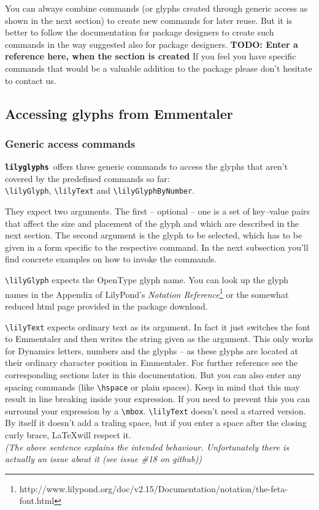 \documentclass{article}
\newcommand{\lilyglyphs}{\texttt{\textbf{lilyglyphs\,}}}
\newcommand*{\cmd}[1]{\texttt{\textbackslash #1}}
\begin{document}
You can always combine commands (or glyphs created through generic access as shown in the next section) to create new commands for later reuse. 
But it is better to follow the documentation for package designers to create such commands in the way suggested also for package designers.
\textbf{TODO: Enter a reference here, when the section is created}
If you feel you have specific commands that would be a valuable addition to the package please don't hesitate to contact us.



\subsection{Accessing glyphs from Emmentaler}
\subsubsection{Generic access commands}
\lilyglyphs offers three generic commands to access the glyphs that aren't covered by the predefined commands so far: \\
\cmd{lilyGlyph}, \cmd{lilyText} and \cmd{lilyGlyphByNumber}. 

They expect two arguments. 
The first -- optional -- one is a set of key--value pairs that affect the size and placement of the glyph and which are described in the next section.
The second argument is the glyph to be selected, which has to be given in a form specific to the respective command.
In the next subsection you'll find concrete examples on how to invoke the commands.

\cmd{lilyGlyph} expects the OpenType glyph name. 
You can look up the glyph names in the Appendix of LilyPond's \emph{Notation Reference}\footnote{http://www.lilypond.org/doc/v2.15/Documentation/notation/the-feta-font.html} or the somewhat reduced html page provided in the package download.

\cmd{lilyText} expects ordinary text as its argument. 
In fact it just switches the font to Emmentaler and then writes the string given as the argument. 
This only works for Dynamics letters, numbers and the glyphs  -- as these glyphs are located at their ordinary character position in Emmentaler. 
For further reference see the corresponding sections later in this documentation. 
But you can also enter any spacing commands (like \cmd{hspace} or plain spaces). 
Keep in mind that this may result in line breaking inside your expression. 
If you need to prevent this you can surround your expression by a \cmd{mbox}.
{
\color{red}
\cmd{lilyText} doesn't need a starred version. 
By itself it doesn't add a traling space, but if you enter a space after the closing curly brace, \LaTeX will respect it.\\
\textit{(The above sentence explains the intended behaviour. Unfortunately there is actually an issue about it (see issue \#18 on github))} 
}
\end{document}
